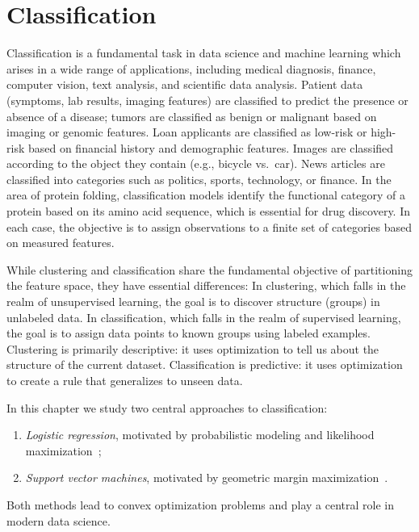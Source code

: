 
\chapter{Classification} \label{c:classification}




Classification is a fundamental task in data science and machine learning which arises in a wide range of applications, including medical diagnosis, finance,  computer vision, text analysis, and scientific data analysis.
Patient data (symptoms, lab results, imaging features) are classified to predict the presence or absence of a disease; tumors are classified as benign or malignant based on imaging or genomic features. Loan applicants are classified as low-risk or high-risk based on financial history and demographic features. Images are classified according to the object they contain (e.g., bicycle vs.\ car). News articles are classified into categories such as politics, sports, technology, or finance. In the area of protein folding, classification models identify the functional category of a protein based on its amino acid sequence, which is essential for drug discovery.
In each case, the objective is to assign observations to a finite set of categories based on measured features.


While clustering and classification share the fundamental objective of partitioning the feature space, they have essential differences:  In clustering, which falls in the realm of unsupervised learning, the goal is to discover structure (groups) in unlabeled data. In classification, which falls in the realm of supervised learning, the goal is to assign data points to known groups using labeled examples. Clustering is primarily descriptive: it uses optimization to tell us about the structure of the current dataset. Classification is predictive: it uses optimization to create a rule that generalizes to unseen data.

In this chapter we study two central approaches to  classification:
\begin{enumerate}
  \item {\em Logistic regression}, motivated by probabilistic modeling and likelihood maximization~\cite{cox1958regression};
  \item {\em Support vector machines}, motivated by geometric margin maximization~\cite{cortes1995support}.
\end{enumerate}
Both methods lead to convex optimization problems and play a central role in modern data science.  

